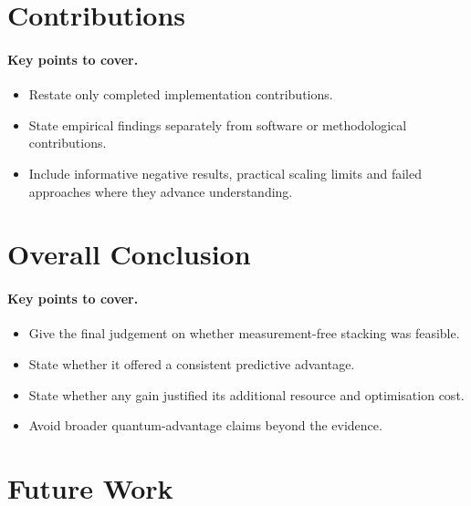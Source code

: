 \documentclass[]{UCD_CS_MSc_AAI_Report}
\newcommand{\sectionbrief}{\paragraph{Key points to cover.}}
\begin{document}
\section{Contributions}
\label{sec:conclusion-contributions}

\sectionbrief
\begin{itemize}
    \item Restate only completed implementation contributions.
    \item State empirical findings separately from software or methodological contributions.
    \item Include informative negative results, practical scaling limits and failed approaches where they advance understanding.
\end{itemize}

\section{Overall Conclusion}
\label{sec:conclusion-overall}

\sectionbrief
\begin{itemize}
    \item Give the final judgement on whether measurement-free stacking was feasible.
    \item State whether it offered a consistent predictive advantage.
    \item State whether any gain justified its additional resource and optimisation cost.
    \item Avoid broader quantum-advantage claims beyond the evidence.
\end{itemize}

\section{Future Work}
\label{sec:conclusion-future}
\end{document}
